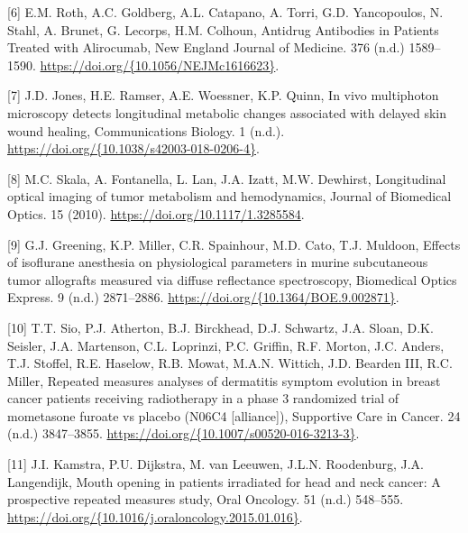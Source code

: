 \documentclass[
]{article}
\begin{document}
\leavevmode\hypertarget{ref-roth2017}{}%
{[}6{]} E.M. Roth, A.C. Goldberg, A.L. Catapano, A. Torri, G.D. Yancopoulos, N. Stahl, A. Brunet, G. Lecorps, H.M. Colhoun, Antidrug Antibodies in Patients Treated with Alirocumab, New England Journal of Medicine. 376 (n.d.) 1589--1590. \href{https://doi.org/\%7B10.1056/NEJMc1616623\%7D}{https://doi.org/\{10.1056/NEJMc1616623\}}.

\leavevmode\hypertarget{ref-jones2018}{}%
{[}7{]} J.D. Jones, H.E. Ramser, A.E. Woessner, K.P. Quinn, In vivo multiphoton microscopy detects longitudinal metabolic changes associated with delayed skin wound healing, Communications Biology. 1 (n.d.). \href{https://doi.org/\%7B10.1038/s42003-018-0206-4\%7D}{https://doi.org/\{10.1038/s42003-018-0206-4\}}.

\leavevmode\hypertarget{ref-skala2010}{}%
{[}8{]} M.C. Skala, A. Fontanella, L. Lan, J.A. Izatt, M.W. Dewhirst, Longitudinal optical imaging of tumor metabolism and hemodynamics, Journal of Biomedical Optics. 15 (2010). \url{https://doi.org/10.1117/1.3285584}.

\leavevmode\hypertarget{ref-greening2018}{}%
{[}9{]} G.J. Greening, K.P. Miller, C.R. Spainhour, M.D. Cato, T.J. Muldoon, Effects of isoflurane anesthesia on physiological parameters in murine subcutaneous tumor allografts measured via diffuse reflectance spectroscopy, Biomedical Optics Express. 9 (n.d.) 2871--2886. \href{https://doi.org/\%7B10.1364/BOE.9.002871\%7D}{https://doi.org/\{10.1364/BOE.9.002871\}}.

\leavevmode\hypertarget{ref-sio2016}{}%
{[}10{]} T.T. Sio, P.J. Atherton, B.J. Birckhead, D.J. Schwartz, J.A. Sloan, D.K. Seisler, J.A. Martenson, C.L. Loprinzi, P.C. Griffin, R.F. Morton, J.C. Anders, T.J. Stoffel, R.E. Haselow, R.B. Mowat, M.A.N. Wittich, J.D. Bearden III, R.C. Miller, Repeated measures analyses of dermatitis symptom evolution in breast cancer patients receiving radiotherapy in a phase 3 randomized trial of mometasone furoate vs placebo (N06C4 {[}alliance{]}), Supportive Care in Cancer. 24 (n.d.) 3847--3855. \href{https://doi.org/\%7B10.1007/s00520-016-3213-3\%7D}{https://doi.org/\{10.1007/s00520-016-3213-3\}}.

\leavevmode\hypertarget{ref-kamstra2015}{}%
{[}11{]} J.I. Kamstra, P.U. Dijkstra, M. van Leeuwen, J.L.N. Roodenburg, J.A. Langendijk, Mouth opening in patients irradiated for head and neck cancer: A prospective repeated measures study, Oral Oncology. 51 (n.d.) 548--555. \href{https://doi.org/\%7B10.1016/j.oraloncology.2015.01.016\%7D}{https://doi.org/\{10.1016/j.oraloncology.2015.01.016\}}.
\end{document}
